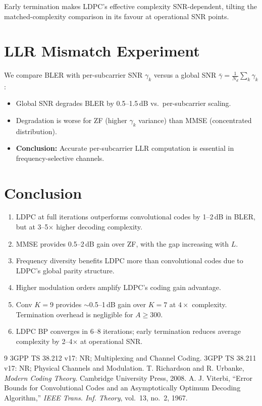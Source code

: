 \documentclass[12pt, a4paper]{article}
\begin{document}
Early termination makes LDPC's effective complexity SNR-dependent, tilting the matched-complexity comparison in its favour at operational SNR points.

\section{LLR Mismatch Experiment}
We compare BLER with per-subcarrier SNR $\gamma_k$ versus a global SNR $\bar{\gamma}=\frac{1}{N_d}\sum_k\gamma_k$:
\begin{itemize}[nosep]
    \item Global SNR degrades BLER by 0.5--1.5\,dB vs.\ per-subcarrier scaling.
    \item Degradation is worse for ZF (higher $\gamma_k$ variance) than MMSE (concentrated distribution).
    \item \textbf{Conclusion:} Accurate per-subcarrier LLR computation is essential in frequency-selective channels.
\end{itemize}

\section{Conclusion}
\begin{enumerate}[nosep]
    \item LDPC at full iterations outperforms convolutional codes by 1--2\,dB in BLER, but at 3--5$\times$ higher decoding complexity.
    \item MMSE provides 0.5--2\,dB gain over ZF, with the gap increasing with $L$.
    \item Frequency diversity benefits LDPC more than convolutional codes due to LDPC's global parity structure.
    \item Higher modulation orders amplify LDPC's coding gain advantage.
    \item Conv $K=9$ provides $\sim$0.5--1\,dB gain over $K=7$ at $4\times$ complexity. Termination overhead is negligible for $A\geq300$.
    \item LDPC BP converges in 6--8 iterations; early termination reduces average complexity by 2--4$\times$ at operational SNR.
\end{enumerate}

\begin{thebibliography}{9}
 3GPP TS 38.212 v17: NR; Multiplexing and Channel Coding.
 3GPP TS 38.211 v17: NR; Physical Channels and Modulation.
 T. Richardson and R. Urbanke, \textit{Modern Coding Theory}. Cambridge University Press, 2008.
 A. J. Viterbi, ``Error Bounds for Convolutional Codes and an Asymptotically Optimum Decoding Algorithm,'' \textit{IEEE Trans. Inf. Theory}, vol.~13, no.~2, 1967.
\end{thebibliography}
\end{document}
